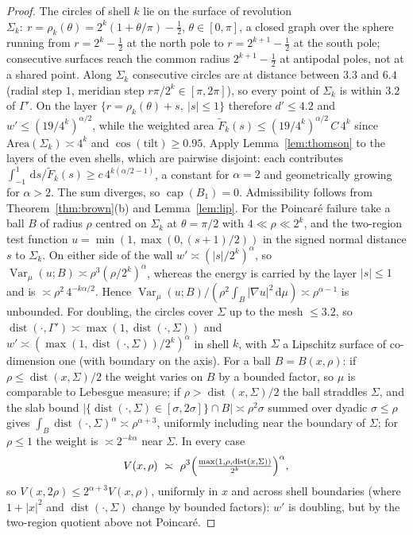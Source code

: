 \documentclass[11pt]{amsart}
\newcommand{\dd}{\,\mathrm{d}}
\newcommand{\abs}[1]{\lvert #1\rvert}
\DeclareMathOperator{\capa}{cap}
\DeclareMathOperator{\dist}{dist}
\DeclareMathOperator{\Var}{Var}
\theoremstyle{plain}
\theoremstyle{definition}
\theoremstyle{remark}
\begin{document}
\begin{proof}
The circles of shell $k$ lie on the surface of revolution
$\Sigma_k:\ r=\rho_k(\theta)=2^k(1+\theta/\pi)-\tfrac12$, $\theta\in[0,\pi]$, a
closed graph over the sphere running from $r=2^k-\frac12$ at the north pole to
$r=2^{k+1}-\frac12$ at the south pole; consecutive surfaces reach the common
radius $2^{k+1}-\frac12$ at antipodal poles, not at a shared point. Along
$\Sigma_k$ consecutive circles are at distance between $3.3$ and $6.4$ (radial
step $1$, meridian step $r\pi/2^k\in[\pi,2\pi]$), so every point of $\Sigma_k$ is
within $3.2$ of $\Gamma'$. On the layer $\{r=\rho_k(\theta)+s,\ \abs s\le1\}$
therefore $d'\le4.2$ and $w'\le(19/4^k)^{\alpha/2}$, while the weighted area
$\tilde F_k(s)\le(19/4^k)^{\alpha/2}\,C\,4^k$ since $\mathrm{Area}(\Sigma_k)\asymp4^k$
and $\cos(\mathrm{tilt})\ge0.95$. Apply Lemma~\ref{lem:thomson} to the layers of
the even shells, which are pairwise disjoint: each contributes
$\int_{-1}^1\dd s/\tilde F_k(s)\ge c\,4^{k(\alpha/2-1)}$, a constant for $\alpha=2$
and geometrically growing for $\alpha>2$. The sum diverges, so $\capa(B_1)=0$.
Admissibility follows from Theorem~\ref{thm:brown}(b) and Lemma~\ref{lem:lip}.
For the Poincar\'e failure take a ball $B$ of radius $\rho$ centred on
$\Sigma_k$ at $\theta=\pi/2$ with $4\ll\rho\ll2^k$, and the two-region test
function $u=\min(1,\max(0,(s+1)/2))$ in the signed normal distance $s$ to
$\Sigma_k$. On either side of the wall $w'\asymp(\abs s/2^k)^\alpha$, so
$\Var_\mu(u;B)\asymp\rho^3(\rho/2^k)^\alpha$, whereas the energy is carried by
the layer $\abs s\le1$ and is $\asymp\rho^2\,4^{-k\alpha/2}$. Hence
$\Var_\mu(u;B)/(\rho^2\int_B\abs{\nabla u}^2\dd\mu)\asymp\rho^{\alpha-1}$ is
unbounded. For doubling, the circles cover $\Sigma$ up to the mesh $\le3.2$, so
$\dist(\cdot,\Gamma')\asymp\max(1,\dist(\cdot,\Sigma))$ and
$w'\asymp(\max(1,\dist(\cdot,\Sigma))/2^k)^\alpha$ in shell $k$, with $\Sigma$ a
Lipschitz surface of co-dimension one (with boundary on the axis). For a ball
$B=B(x,\rho)$: if $\rho\le\dist(x,\Sigma)/2$ the weight varies on $B$ by a
bounded factor, so $\mu$ is comparable to Lebesgue measure; if
$\rho>\dist(x,\Sigma)/2$ the ball straddles $\Sigma$, and the slab bound
$\abs{\{\dist(\cdot,\Sigma)\in[\sigma,2\sigma]\}\cap B}\asymp\rho^2\sigma$ summed
over dyadic $\sigma\le\rho$ gives $\int_B\dist(\cdot,\Sigma)^\alpha\asymp
\rho^{\alpha+3}$, uniformly including near the boundary of $\Sigma$; for
$\rho\le1$ the weight is $\asymp2^{-k\alpha}$ near $\Sigma$. In every case
\[
V(x,\rho)\ \asymp\ \rho^3\Bigl(\tfrac{\max(1,\rho,\dist(x,\Sigma))}{2^k}\Bigr)^\alpha,
\]
so $V(x,2\rho)\le2^{\alpha+3}V(x,\rho)$, uniformly in $x$ and across shell
boundaries (where $1+\abs x^2$ and $\dist(\cdot,\Sigma)$ change by bounded
factors): $w'$ is doubling, but by the two-region quotient above not Poincar\'e.
\end{proof}
\end{document}
